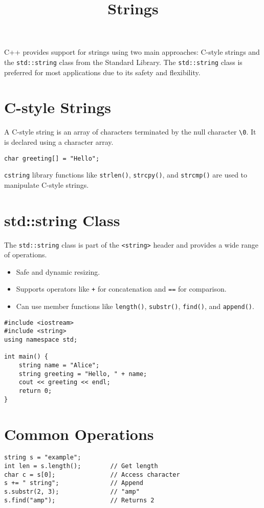 \documentclass{article}
\title{Strings}
\author{}
\date{}
\begin{document}
\maketitle


C++ provides support for strings using two main approaches: C-style strings and the \texttt{std::string} class from the Standard Library. The \texttt{std::string} class is preferred for most applications due to its safety and flexibility.

\section{C-style Strings}

A C-style string is an array of characters terminated by the null character \texttt{\textbackslash0}. It is declared using a character array.

\begin{lstlisting}[style=cppstyle]
char greeting[] = "Hello";
\end{lstlisting}

\texttt{cstring} library functions like \texttt{strlen()}, \texttt{strcpy()}, and \texttt{strcmp()} are used to manipulate C-style strings.

\section{std::string Class}

The \texttt{std::string} class is part of the \texttt{<string>} header and provides a wide range of operations.

\begin{itemize}
  \item Safe and dynamic resizing.
  \item Supports operators like \texttt{+} for concatenation and \texttt{==} for comparison.
  \item Can use member functions like \texttt{length()}, \texttt{substr()}, \texttt{find()}, and \texttt{append()}.
\end{itemize}

\begin{lstlisting}[style=cppstyle]
#include <iostream>
#include <string>
using namespace std;

int main() {
    string name = "Alice";
    string greeting = "Hello, " + name;
    cout << greeting << endl;
    return 0;
}
\end{lstlisting}

\section{Common Operations}

\begin{lstlisting}[style=cppstyle]
string s = "example";
int len = s.length();        // Get length
char c = s[0];               // Access character
s += " string";              // Append
s.substr(2, 3);              // "amp"
s.find("amp");               // Returns 2
\end{lstlisting}
\end{document}
